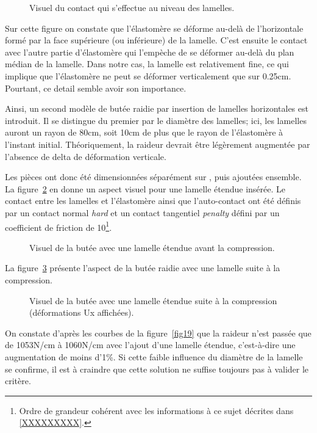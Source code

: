 ﻿\documentclass{article}
\newcommand{\abaqus}{\bsc{Abaqus}\xspace}
\begin{document}
\begin{figure}[!h]
	\centering
	\caption{Visuel du contact qui s'effectue au niveau des lamelles.}
	\label{fig16}
\end{figure}

Sur cette figure on constate que l'élastomère se déforme au-delà de l'horizontale formé par la face supérieure (ou inférieure) de la lamelle. C'est ensuite le contact avec l'autre partie d'élastomère qui l'empèche de se déformer au-delà du plan médian de la lamelle. Dans notre cas, la lamelle est relativement fine, ce qui implique que l'élastomère ne peut se déformer verticalement que sur 0.25cm. Pourtant, ce detail semble avoir son importance.

Ainsi, un second modèle de butée raidie par insertion de lamelles horizontales est introduit. Il se distingue du premier par le diamètre des lamelles; ici, les lamelles auront un rayon de 80cm, soit 10cm de plus que le rayon de l'élastomère à l'instant initial. Théoriquement, la raideur devrait être légèrement augmentée par l'absence de delta de déformation verticale.

Les pièces ont donc été dimensionnées séparément sur \abaqus, puis ajoutées ensemble. La figure~\ref{fig17} en donne un aspect visuel pour une lamelle étendue insérée. Le contact entre les lamelles et l'élastomère ainsi que l'auto-contact ont été définis par un contact normal \textit{hard} et un contact tangentiel \textit{penalty} défini par un coefficient de friction de 10\footnote{Ordre de grandeur cohérent avec les informations à ce sujet décrites dans \ref{XXXXXXXXX}.}.

\begin{figure}[!h]
	\centering
	\caption{Visuel de la butée avec une lamelle étendue avant la compression.}
	\label{fig17}
\end{figure}

La figure~\ref{fig18} présente l'aspect de la butée raidie avec une lamelle suite à la compression.

\begin{figure}[!h]
	\centering
	\caption{Visuel de la butée avec une lamelle étendue suite à la compression (déformations Ux affichées).}
	\label{fig18}
\end{figure}

On constate d'après les courbes de la figure~\ref{fig19} que la raideur n'est passée que de 1053N/cm à 1060N/cm avec l'ajout d'une lamelle étendue, c'est-à-dire une augmentation de moins d'1\%. Si cette faible influence du diamètre de la lamelle se confirme, il est à craindre que cette solution ne suffise toujours pas à valider le critère.
\end{document}
